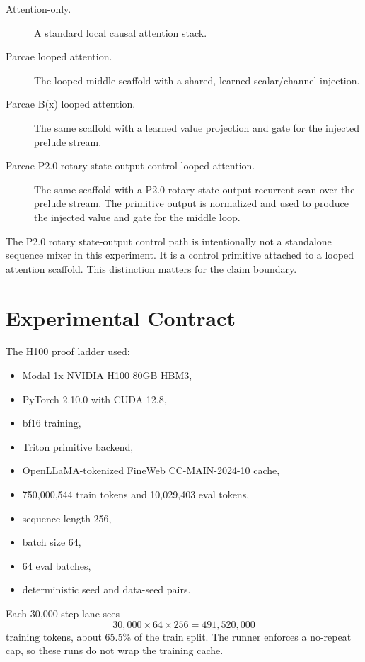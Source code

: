 \documentclass[11pt]{article}
\newcommand{\pname}{P2.0 rotary state-output}
\newcommand{\pcontrol}{P2.0 rotary state-output control}
\newcommand{\parcae}{Parcae}
\newcommand{\bx}{B(x)}
\begin{document}
\begin{description}
  \item[Attention-only.] A standard local causal attention stack.
  \item[\parcae{} looped attention.] The looped middle scaffold with a shared,
    learned scalar/channel injection.
  \item[\parcae{} \bx{} looped attention.] The same scaffold with a learned
    value projection and gate for the injected prelude stream.
  \item[\parcae{} \pcontrol{} looped attention.] The same scaffold with a
    \pname{} recurrent scan over the prelude stream. The primitive output is
    normalized and used to produce the injected value and gate for the middle
    loop.
\end{description}

The \pcontrol{} path is intentionally not a standalone sequence mixer in this
experiment. It is a control primitive attached to a looped attention scaffold.
This distinction matters for the claim boundary.

\section{Experimental Contract}

The H100 proof ladder used:

\begin{itemize}
  \item Modal 1x NVIDIA H100 80GB HBM3,
  \item PyTorch 2.10.0 with CUDA 12.8,
  \item bf16 training,
  \item Triton primitive backend,
  \item OpenLLaMA-tokenized FineWeb CC-MAIN-2024-10 cache,
  \item 750,000,544 train tokens and 10,029,403 eval tokens,
  \item sequence length 256,
  \item batch size 64,
  \item 64 eval batches,
  \item deterministic seed and data-seed pairs.
\end{itemize}

Each 30,000-step lane sees
\[
  30{,}000 \times 64 \times 256 = 491{,}520{,}000
\]
training tokens, about 65.5\% of the train split. The runner enforces a
no-repeat cap, so these runs do not wrap the training cache.
\end{document}
